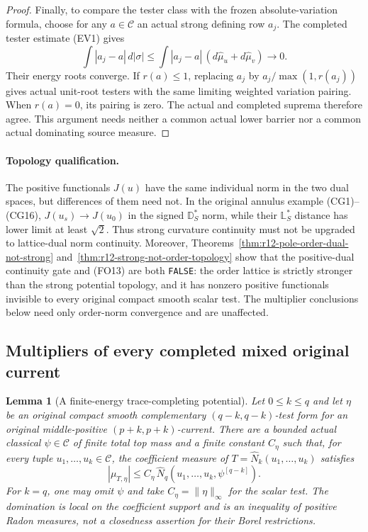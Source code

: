 \documentclass[11pt,a4paper]{article}
\numberwithin{equation}{section}
\newtheorem{lemma}[theorem]{Lemma}
\theoremstyle{definition}
\theoremstyle{remark}
\begin{document}
\begin{proof}
Finally, to compare the tester class with the frozen
absolute-variation formula, choose for any $a\in\mathscr C$
an actual strong defining row $a_j$.  The completed tester
estimate \textup{(EV1)} gives
\[
 \int|a_j-a|\,d|\sigma|
  \le\int|a_j-a|\,(d\widehat\mu_u+d\widehat\mu_v)
                                      \longrightarrow0.
\]
Their energy roots converge.  If $r(a)\le1$, replacing
$a_j$ by $a_j/\max(1,r(a_j))$ gives actual unit-root
testers with the same limiting weighted variation
pairing.  When $r(a)=0$, its pairing is zero.  The
actual and completed suprema therefore agree.  This
argument needs neither a common actual lower barrier
nor a common actual dominating source measure.
\end{proof}

\paragraph{Topology qualification.}
The positive functionals $J(u)$ have the same individual
norm in the two dual spaces, but differences of them need
not.  In the original annulus example \textup{(CG1)--(CG16)},
$J(u_s)\to J(u_0)$ in the signed $\mathbb D_S^*$ norm,
while their $\mathbb L_S^*$ distance has lower limit at
least $\sqrt2$.  Thus strong curvature continuity must not
be upgraded to lattice-dual norm continuity.  Moreover,
Theorems~\ref{thm:r12-pole-order-dual-not-strong}
and~\ref{thm:r12-strong-not-order-topology} show that
the positive-dual continuity gate and \textup{(FO13)}
are both \texttt{FALSE}: the order lattice is strictly
stronger than the strong potential topology, and it has
nonzero positive functionals invisible to every original
compact smooth scalar test.  The multiplier conclusions
below need only order-norm convergence and are unaffected.

\subsection{Multipliers of every completed mixed original current}

\begin{lemma}[A finite-energy trace-completing potential]
\label{lem:r12-trace-completing-potential}
Let $0\le k\le q$ and let $\eta$ be an original compact
smooth complementary $(q-k,q-k)$-test form for an original
middle-positive $(p+k,p+k)$-current.  There are a bounded
actual classical $\psi\in\mathscr C$ of finite total top
mass and a finite constant $C_\eta$ such that, for every
tuple $u_1,\ldots,u_k\in\mathscr C$, the coefficient
measure of $T=\widehat N_k(u_1,\ldots,u_k)$ satisfies
\[
 |\mu_{T,\eta}|
        \le C_\eta\,
             \widehat N_q(u_1,\ldots,u_k,\psi^{[q-k]}).
 \tag{OL11}
\]
For $k=q$, one may omit $\psi$ and take
$C_\eta=\|\eta\|_\infty$ for the scalar test.
The domination is local on the coefficient support and
is an inequality of positive Radon measures, not a
closedness assertion for their Borel restrictions.
\end{lemma}
\end{document}
